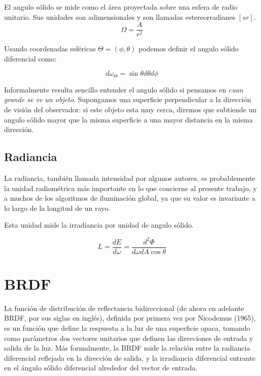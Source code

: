 El angulo sólido se mide como el área proyectada sobre una esfera de radio unitario. Sus unidades son adimensionales y son llamadas estereorradianes $[sr]$.
\begin{equation}
\Omega = \frac{A}{r^2}
\end{equation}


Usando coordenadas esféricas $\Theta = (\phi , \theta )$ podemos definir el angulo sólido diferencial como:

\begin{equation}
d \omega _ \Theta = \sin \theta d \theta d \phi
\end{equation}

Informalmente resulta sencillo entender el angulo sólido si pensamos en \emph{cuan grande se ve un objeto}. Supongamos una superficie perpendicular a la dirección de visión del observador: si este objeto esta muy cerca, diremos que subtiende un angulo sólido mayor que la misma superficie a una mayor distancia en la misma dirección.

\clearpage

\subsection{Radiancia}

La radiancia, también llamada intensidad por algunos autores, es probablemente la unidad radiométrica más importante en lo que concierne al presente trabajo, y a muchos de los algoritmos de iluminación global, ya que su valor es invariante a lo largo de la longitud de un rayo.

Esta unidad mide la irradiancia por unidad de angulo sólido.

\begin{equation}
L = \frac{dE}{d\omega} = \frac{d^2\Phi}{d\omega dA\cos \theta} 
\end{equation}


\clearpage

\section{BRDF}

La función de distribución de reflectancia bidireccional (de ahora en adelante BRDF, por sus siglas en inglés), definida por primera vez por \cite{Nicodemus1965} Nicodemus (1965), es un función que define la respuesta a la luz de una superficie opaca, tomando como parámetros dos vectores unitarios que definen las direcciones de entrada y salida de la luz. Más formalmente, la BRDF mide la relación entre la radiancia diferencial reflejada en la dirección de salida, y la irradiancia diferencial entrante en el ángulo sólido diferencial alrededor del vector de entrada.

